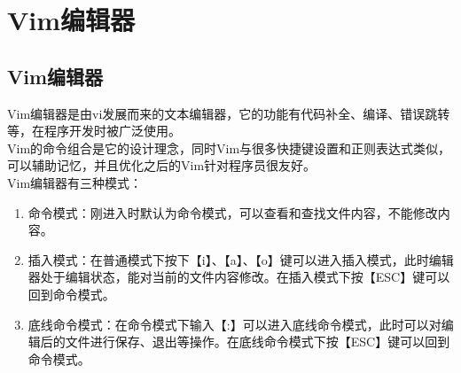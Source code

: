 \documentclass[12pt, openany, oneside]{book}
\begin{document}
\begin{table}[H]
    \centering
    \caption{nano编辑器命令}
\end{table}

\newpage

\section{Vim编辑器}

\subsection{Vim编辑器}

Vim编辑器是由vi发展而来的文本编辑器，它的功能有代码补全、编译、错误跳转等，在程序开发时被广泛使用。 \\

Vim的命令组合是它的设计理念，同时Vim与很多快捷键设置和正则表达式类似，可以辅助记忆，并且优化之后的Vim针对程序员很友好。 \\

Vim编辑器有三种模式：

\begin{enumerate}
    \item 命令模式：刚进入时默认为命令模式，可以查看和查找文件内容，不能修改内容。
    
    \item 插入模式：在普通模式下按下【i】、【a】、【o】键可以进入插入模式，此时编辑器处于编辑状态，能对当前的文件内容修改。在插入模式下按【ESC】键可以回到命令模式。

    \item 底线命令模式：在命令模式下输入【:】可以进入底线命令模式，此时可以对编辑后的文件进行保存、退出等操作。在底线命令模式下按【ESC】键可以回到命令模式。
\end{enumerate}
\end{document}
